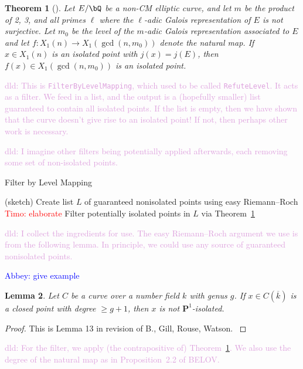 \documentclass[11pt,reqno]{amsart}
\theoremstyle{plain}
\newtheorem{theorem}{Theorem}%
\newtheorem{lemma}[theorem]{Lemma}
\theoremstyle{definition}
\newcommand{\Q}{\bQ}
\newcommand{\PP}{\mathbf P}
\newcommand{\abbey}[1]{\textcolor{blue}{Abbey: #1}}
\newcommand{\dld}[1]{\textcolor{Plum}{dld: #1}}
\newcommand{\timo}[1]{\textcolor{red}{Timo: #1}}
\begin{document}
\begin{theorem}[\cite{BELOV}]\label{BELOVthm}
Let $E/\Q$ be a non-CM elliptic curve, and let $m$ be the product of 2, 3, and all primes $\ell$ where the $\ell$-adic Galois representation of $E$ is not surjective. Let $m_0$ be the level of the $m$-adic Galois representation associated to $E$ and let $f\colon X_1(n) \rightarrow X_1(\gcd(n,m_0))$ denote the natural map. If $x\in X_1(n)$ is an isolated point with $j(x)=j(E)$, then $f(x)\in X_1(\gcd(n,m_0))$ is an isolated point.
\end{theorem}

\dld{This is \texttt{FilterByLevelMapping}, which used to be called
\texttt{RefuteLevel}. It acts as a filter. We feed in a list, and the output is
a (hopefully smaller) list guaranteed to contain all isolated points. If the
list is empty, then we have shown that the curve doesn't give rise to an
isolated point! If not, then perhaps other work is necessary.}

\dld{I imagine other filters being potentially applied afterwards, each
removing some set of non-isolated points.}

\begin{algorithm}[H]\caption{Filter by Level Mapping}\label{alg:level_mapping}
  (sketch)\;
  Create list $L$ of guaranteed nonisolated points using easy Riemann--Roch \timo{elaborate}\;
  Filter potentially isolated points in $L$ via Theorem~\ref{BELOVthm}\;
\end{algorithm}

\dld{I collect the ingredients for use. The easy Riemann--Roch argument we use
is from the following lemma. In principle, we could use any source of
guaranteed nonisolated points.}

\abbey{give example}

\begin{lemma}
Let $C$ be a curve over a number field $k$ with genus $g$. If $x \in C(\overline{k})$ is a closed point with degree
$\geq g+1$, then $x$ is not $\PP^{1}$-isolated.
\end{lemma}

\begin{proof}
This is Lemma 13 in revision of B., Gill, Rouse, Watson. \cite{OddDeg}
\end{proof}

\dld{For the filter, we apply (the contrapositive of) Theorem~\ref{BELOVthm}.
We also use the degree of the natural map as in Proposition~2.2 of BELOV.}
\end{document}

